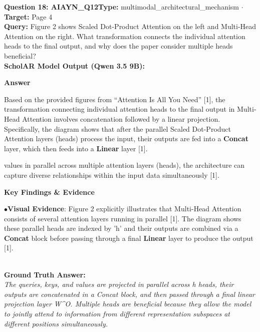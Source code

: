 \documentclass[10pt,a4paper]{article}
\begin{document}
\vspace{4pt}
\begin{tcolorbox}[questionbox]
{\noindent\bfseries\large\color{navy} Question 18: AIAYN\_Q12}\hfill {\footnotesize\color{darkteal}\textbf{Type:} multimodal\_architectural\_mechanism $\cdot$ \textbf{Target:} Page 4}\\[4pt]
{\noindent\bfseries\color{accentblue} Query: } Figure 2 shows Scaled Dot-Product Attention on the left and Multi-Head Attention on the right. What transformation connects the individual attention heads to the final output, and why does the paper consider multiple heads beneficial?\\[6pt]
{\noindent\bfseries\color{navy} ScholAR Model Output (Qwen 3.5 9B):}\\[2pt]
{\small \noindent \textbf{Answer}\par\vspace{3pt}Based on the provided figures from ``Attention Is All You Need'' [1], the transformation connecting individual attention heads to the final output in Multi-Head Attention involves concatenation followed by a linear projection. Specifically, the diagram shows that after the parallel Scaled Dot-Product Attention layers (heads) process the input, their outputs are fed into a \textbf{Concat} layer, which then feeds into a \textbf{Linear} layer [1].\par\vspace{3pt}values in parallel across multiple attention layers (heads), the architecture can capture diverse relationships within the input data simultaneously [1].\par\vspace{3pt}\noindent \textbf{Key Findings \& Evidence}\par\vspace{3pt}\noindent\hspace*{8pt}$\bullet$\hspace*{4pt}\textbf{Visual Evidence}: Figure 2 explicitly illustrates that Multi-Head Attention consists of several attention layers running in parallel [1]. The diagram shows these parallel heads are indexed by 'h' and their outputs are combined via a \textbf{Concat} block before passing through a final \textbf{Linear} layer to produce the output [1].}\\[6pt]
{\noindent\bfseries\color{darkteal} Ground Truth Answer:}\\[2pt]
{\small\itshape The queries, keys, and values are projected in parallel across h heads, their outputs are concatenated in a Concat block, and then passed through a final linear projection layer W\textasciicircum{}O. Multiple heads are beneficial because they allow the model to jointly attend to information from different representation subspaces at different positions simultaneously.}\\[4pt]

\end{tcolorbox}
\end{document}
